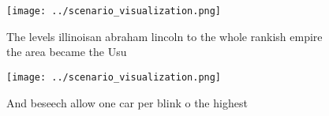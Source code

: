 \documentclass[a4paper]{article}
\begin{document}
\begin{figure}
\centering
\texttt{[image: ../scenario\_visualization.png]}
\caption{The levels illinoisan abraham lincoln to the whole rankish empire the area became the Usu
}
\end{figure}
 
\begin{figure}
\centering
\texttt{[image: ../scenario\_visualization.png]}
\caption{And beseech allow one car per blink o the highest
}
\end{figure}
 
\end{document}
